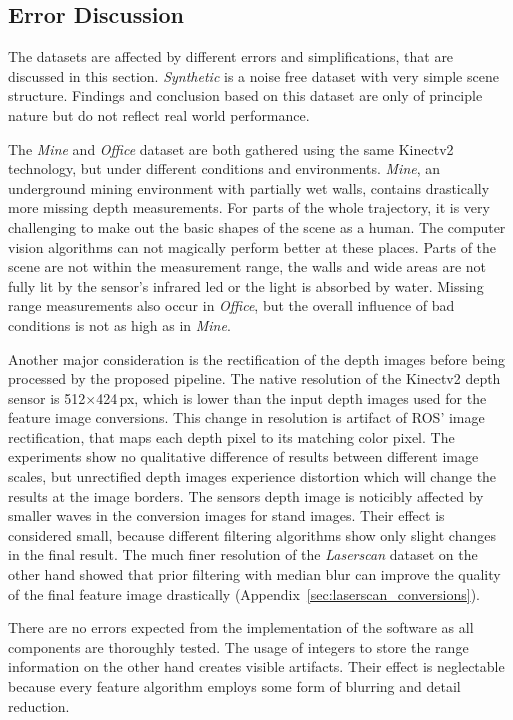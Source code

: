 \subsection{Error Discussion}

The datasets are affected by different errors and simplifications, that are discussed in this section.
\emph{Synthetic} is a noise free dataset with very simple scene structure.
Findings and conclusion based on this dataset are only of principle nature but do not reflect real world performance.

The \emph{Mine} and \emph{Office} dataset are both gathered using the same Kinectv2 technology, but under different conditions and environments.
\emph{Mine}, an underground mining environment with partially wet walls, contains drastically more missing depth measurements.
For parts of the whole trajectory, it is very challenging to make out the basic shapes of the scene as a human.
The computer vision algorithms can not magically perform better at these places.
Parts of the scene are not within the measurement range, the walls and wide areas are not fully lit by the sensor's infrared \acrshort{led} or the light is absorbed by water.
Missing range measurements also occur in \emph{Office}, but the overall influence of bad conditions is not as high as in \emph{Mine}.

Another major consideration is the rectification of the depth images before being processed by the proposed pipeline.
The native resolution of the Kinectv2 depth sensor is 512$\times$424\,px\cite{wasenmuller_accv2016}, which is lower than the input depth images used for the feature image conversions.
This change in resolution is artifact of \acrshort{ROS}' image rectification, that maps each depth pixel to its matching color pixel.
The experiments show no qualitative difference of results between different image scales, but unrectified depth images experience distortion which will change the results at the image borders.
The sensors depth image is noticibly affected by smaller waves in the conversion images for stand images.
Their effect is considered small, because different filtering algorithms show only slight changes in the final result.
The much finer resolution of the \emph{Laserscan} dataset on the other hand showed that prior filtering with median blur can improve the quality of the final feature image drastically (Appendix~\ref{sec:laserscan_conversions}).

There are no errors expected from the implementation of the software as all components are thoroughly tested.
The usage of integers to store the range information on the other hand creates visible artifacts.
Their effect is neglectable because every feature algorithm employs some form of blurring and detail reduction.
